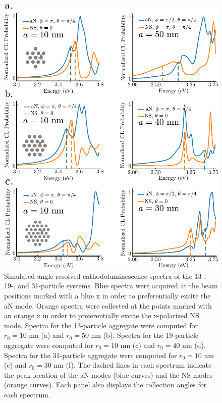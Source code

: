 \documentclass[journal=apchd5,manuscript=article]{achemso}
\begin{document}






\begin{figure}
\includegraphics{fig7.pdf}
\caption{Simulated angle-resolved cathodoluminescence spectra of the 13-, 19-, and 31-particle systems. Blue spectra were acquired at the beam positions marked with a blue x in order to preferentially excite the aN mode. Orange spectra were collected at the points marked with an orange x in order to preferentially excite the x-polarized NS mode. Spectra for the 13-particle aggregate were computed for $r_0 = 10$ nm (a) and $r_0 = 50$ nm (b). Spectra for the 19-particle aggregate were computed for $r_0 = 10$ nm (c) and $r_0 = 40$ nm (d). Spectra for the 31-particle aggregate were computed for $r_0 = 10$ nm (e) and $r_0 = 30$ nm (f). The dashed lines in each spectrum indicate the peak location of the aN modes (blue curves) and the NS modes (orange curves). Each panel also displays the collection angles for each spectrum.}
\label{kagan_CL}
\end{figure}
\end{document}
